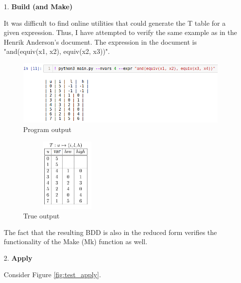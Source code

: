 \documentclass[a4paper, titlepage, 12pt]{article}
\numberwithin{equation}{section}
\begin{document}
            \begin{itemize}
                \item[1.] \textbf{Build (and Make)}
                    
                    It was difficult to find online utilities that could generate the T table for a given expression.
                    Thus, I have attempted to verify the same example as in the Henrik Anderson's document.
                    The expression in the document is "and(equiv(x1, x2), equiv(x2, x3))".

                    \begin{figure}[htp]
                        \centering
                        \includegraphics[height=0.3\textwidth, width=\textwidth]{img/robdd_build.png}
                        \caption{Program output}
                        \label{fig:build_prog_out}
                    \end{figure}
                    
                    \begin{figure}[htp]
                        \centering
                        \includegraphics[height=140px, width=180px]{img/true_T_build.png}
                        \caption{True output}
                        \label{fig:build_true_out}
                    \end{figure}

                    The fact that the resulting BDD is also in the reduced form verifies the functionality of the Make (Mk) function as well.
                \item[2.] \textbf{Apply}
                    
                    Consider Figure \ref{fig:test_apply}.


\end{itemize}
\end{document}
